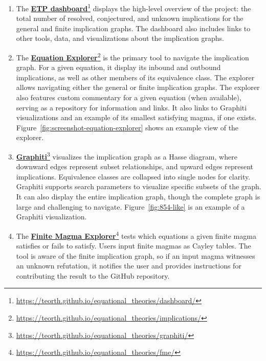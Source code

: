 \begin{enumerate}
  \item The \textbf{\href{https://teorth.github.io/equational_theories/dashboard/}{ETP dashboard}}\footnote{\url{https://teorth.github.io/equational_theories/dashboard/}} displays the high-level overview of the project: the total number of resolved, conjectured, and unknown implications for the general and finite implication graphs. The dashboard also includes links to other tools, data, and visualizations about the implication graphs.
  \item The \textbf{\href{https://teorth.github.io/equational_theories/implications/}{Equation Explorer}}\footnote{\url{https://teorth.github.io/equational_theories/implications/}} is the primary tool to navigate the implication graph. For a given equation, it display its inbound and outbound implications, as well as other members of its equivalence class. The explorer allows navigating either the general or finite implication graphs. The explorer also features custom commentary for a given equation (when available), serving as a repository for information and links. It also links to Graphiti visualizations and an example of its smallest satisfying magma, if one exists. Figure~\ref{fig:screenshot-equation-explorer} shows an example view of the explorer.
  \item \textbf{\href{https://teorth.github.io/equational_theories/graphiti/}{Graphiti}}\footnote{\url{https://teorth.github.io/equational_theories/graphiti/}} visualizes the implication graph as a Hasse diagram, where downward edges represent subset relationships, and upward edges represent implications. Equivalence classes are collapsed into single nodes for clarity. Graphiti supports search parameters to visualize specific subsets of the graph. It can also display the entire implication graph, though the complete graph is large and challenging to navigate. Figure~\ref{fig:854-like} is an example of a Graphiti visualization.
  \item The \textbf{\href{https://teorth.github.io/equational_theories/fme/}{Finite Magma Explorer}}\footnote{\url{https://teorth.github.io/equational_theories/fme/}} tests which equations a given finite magma satisfies or fails to satisfy. Users input finite magmas as Cayley tables. The tool is aware of the finite implication graph, so if an input magma witnesses an unknown refutation, it notifies the user and provides instructions for contributing the result to the GitHub repository.
\end{enumerate}

